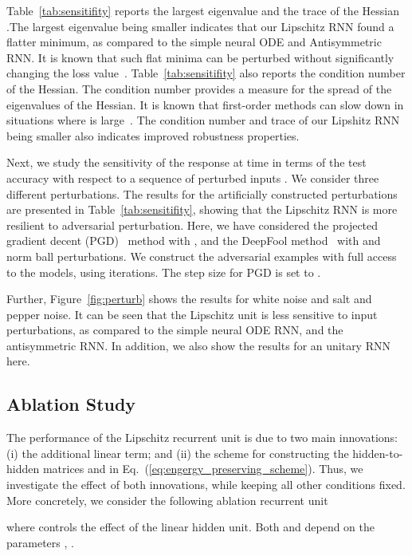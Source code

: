 \documentclass{article} \usepackage{iclr2021_conference,times}
\begin{document}
Table~\ref{tab:sensitifity} reports the largest eigenvalue  and the trace of the Hessian .The largest eigenvalue being smaller indicates that our Lipschitz RNN found a flatter minimum, as compared to the simple neural ODE and Antisymmetric RNN.
It is known that such flat minima can be perturbed without significantly changing the loss value~\citep{hochreiter1997flat}. 
Table~\ref{tab:sensitifity} also reports the condition number  of the Hessian.
The condition number  provides a measure for the spread of the eigenvalues of the Hessian.
It is known that first-order methods can slow down in situations where  is large~\citep{bottou2008tradeoffs}. 
The condition number and trace of our Lipshitz RNN being smaller also indicates improved robustness properties.


Next, we study the sensitivity of the response  at time  in terms of the test accuracy with respect to a sequence of perturbed inputs . 
We consider three different perturbations. 
The results for the artificially constructed perturbations are presented in Table~\ref{tab:sensitifity}, showing that the Lipschitz RNN is more resilient to adversarial perturbation.
Here, we have considered the projected gradient decent (PGD)~\citep{goodfellow2014explaining} method with , and the DeepFool method~\citep{moosavi2016deepfool} with  and  norm ball perturbations.
We construct the adversarial examples with full access to the models, using  iterations. The step size for PGD is set to .


Further, Figure~\ref{fig:perturb} shows the results for white noise and salt and pepper noise. It can be seen that the Lipschitz unit is less sensitive to input perturbations, as compared to the simple neural ODE RNN, and the antisymmetric RNN. In addition, we also show the results for an unitary RNN here.


\subsection{Ablation Study}\label{sec:ablation}


The performance of the Lipschitz recurrent unit is due to two main innovations: (i) the additional linear term; and (ii) the scheme for constructing the hidden-to-hidden matrices  and  in Eq.~(\ref{eq:engergy_preserving_scheme}).
Thus, we investigate the effect of both innovations, while keeping all other conditions fixed. More concretely, we consider the following ablation recurrent unit

where  controls the effect of the linear hidden unit. 
Both  and  depend on the parameters , .
\end{document}
